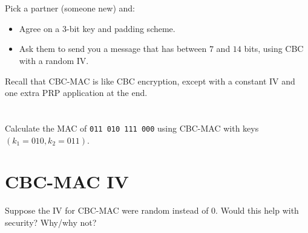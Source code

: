 \documentclass[12pt]{article}
\begin{document}
\section{}

\label{encrypt}

Pick a partner (someone new) and:

\begin{itemize}
\item Agree on a 3-bit key and padding scheme.

\item Ask them to send you a message that has between $7$ and $14$ bits, using CBC with a random IV.
\end{itemize}
 
\newpage

Recall that CBC-MAC is like CBC encryption, except with a constant IV and one extra PRP application at the end.

\begin{center}
\end{center}

\section{}

Calculate the MAC of {\tt 011~010~111~000} using CBC-MAC with keys $(k_1 = 010, k_2 = 011)$.


\section{CBC-MAC IV}


Suppose the IV for CBC-MAC were random instead of $0$. Would this help with security? Why/why not?

\end{document}
